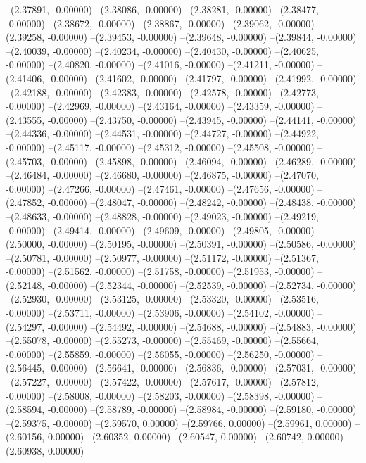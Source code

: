 --(2.37891, -0.00000)
--(2.38086, -0.00000)
--(2.38281, -0.00000)
--(2.38477, -0.00000)
--(2.38672, -0.00000)
--(2.38867, -0.00000)
--(2.39062, -0.00000)
--(2.39258, -0.00000)
--(2.39453, -0.00000)
--(2.39648, -0.00000)
--(2.39844, -0.00000)
--(2.40039, -0.00000)
--(2.40234, -0.00000)
--(2.40430, -0.00000)
--(2.40625, -0.00000)
--(2.40820, -0.00000)
--(2.41016, -0.00000)
--(2.41211, -0.00000)
--(2.41406, -0.00000)
--(2.41602, -0.00000)
--(2.41797, -0.00000)
--(2.41992, -0.00000)
--(2.42188, -0.00000)
--(2.42383, -0.00000)
--(2.42578, -0.00000)
--(2.42773, -0.00000)
--(2.42969, -0.00000)
--(2.43164, -0.00000)
--(2.43359, -0.00000)
--(2.43555, -0.00000)
--(2.43750, -0.00000)
--(2.43945, -0.00000)
--(2.44141, -0.00000)
--(2.44336, -0.00000)
--(2.44531, -0.00000)
--(2.44727, -0.00000)
--(2.44922, -0.00000)
--(2.45117, -0.00000)
--(2.45312, -0.00000)
--(2.45508, -0.00000)
--(2.45703, -0.00000)
--(2.45898, -0.00000)
--(2.46094, -0.00000)
--(2.46289, -0.00000)
--(2.46484, -0.00000)
--(2.46680, -0.00000)
--(2.46875, -0.00000)
--(2.47070, -0.00000)
--(2.47266, -0.00000)
--(2.47461, -0.00000)
--(2.47656, -0.00000)
--(2.47852, -0.00000)
--(2.48047, -0.00000)
--(2.48242, -0.00000)
--(2.48438, -0.00000)
--(2.48633, -0.00000)
--(2.48828, -0.00000)
--(2.49023, -0.00000)
--(2.49219, -0.00000)
--(2.49414, -0.00000)
--(2.49609, -0.00000)
--(2.49805, -0.00000)
--(2.50000, -0.00000)
--(2.50195, -0.00000)
--(2.50391, -0.00000)
--(2.50586, -0.00000)
--(2.50781, -0.00000)
--(2.50977, -0.00000)
--(2.51172, -0.00000)
--(2.51367, -0.00000)
--(2.51562, -0.00000)
--(2.51758, -0.00000)
--(2.51953, -0.00000)
--(2.52148, -0.00000)
--(2.52344, -0.00000)
--(2.52539, -0.00000)
--(2.52734, -0.00000)
--(2.52930, -0.00000)
--(2.53125, -0.00000)
--(2.53320, -0.00000)
--(2.53516, -0.00000)
--(2.53711, -0.00000)
--(2.53906, -0.00000)
--(2.54102, -0.00000)
--(2.54297, -0.00000)
--(2.54492, -0.00000)
--(2.54688, -0.00000)
--(2.54883, -0.00000)
--(2.55078, -0.00000)
--(2.55273, -0.00000)
--(2.55469, -0.00000)
--(2.55664, -0.00000)
--(2.55859, -0.00000)
--(2.56055, -0.00000)
--(2.56250, -0.00000)
--(2.56445, -0.00000)
--(2.56641, -0.00000)
--(2.56836, -0.00000)
--(2.57031, -0.00000)
--(2.57227, -0.00000)
--(2.57422, -0.00000)
--(2.57617, -0.00000)
--(2.57812, -0.00000)
--(2.58008, -0.00000)
--(2.58203, -0.00000)
--(2.58398, -0.00000)
--(2.58594, -0.00000)
--(2.58789, -0.00000)
--(2.58984, -0.00000)
--(2.59180, -0.00000)
--(2.59375, -0.00000)
--(2.59570, 0.00000)
--(2.59766, 0.00000)
--(2.59961, 0.00000)
--(2.60156, 0.00000)
--(2.60352, 0.00000)
--(2.60547, 0.00000)
--(2.60742, 0.00000)
--(2.60938, 0.00000)

